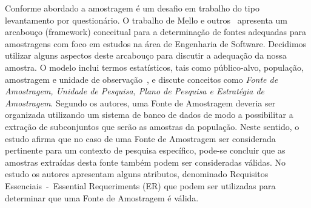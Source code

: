 Conforme abordado a amostragem é um desafio em trabalho do tipo levantamento
por questionário. O trabalho de Mello e outros~\cite{de2014towards} apresenta um
arcabouço (framework) conceitual para a determinação de fontes adequadas para
amostragens com foco em estudos na área de Engenharia de Software. Decidimos
utilizar alguns aspectos deste arcabouço para discutir a adequação da nossa
amostra. O modelo inclui termos estatísticos, tais como público-alvo, população,
amostragem e unidade de observação~\cite{thompson2012sampling}, e discute
conceitos como \textit{Fonte de Amostragem, Unidade de Pesquisa, Plano de
    Pesquisa e Estratégia de Amostragem}. Segundo os autores, uma Fonte de
Amostragem deveria ser organizada utilizando um sistema de banco de dados de
modo a possibilitar a extração de subconjuntos que serão as amostras da
população. Neste sentido, o estudo afirma que no caso de uma Fonte de Amostragem
ser considerada pertinente para um contexto de pesquisa específico, pode-se
concluir que as amostras extraídas desta fonte também podem ser consideradas
válidas. No estudo os autores apresentam alguns atributos, denominado Requisitos
Essenciais~-~Essential Requeriments (ER) que podem ser utilizadas para
determinar que uma Fonte de Amostragem é válida.


